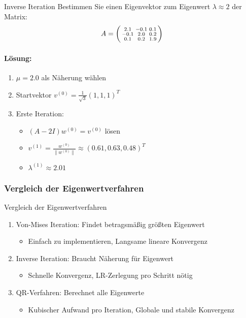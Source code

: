 \begin{example2}{Inverse Iteration}
Bestimmen Sie einen Eigenvektor zum Eigenwert $\lambda \approx 2$ der Matrix:
$$A = \begin{psmallmatrix}
2.1 & -0.1 & 0.1 \\
-0.1 & 2.0 & 0.2 \\
0.1 & 0.2 & 1.9
\end{psmallmatrix}$$

\paragraph{Lösung:}
\begin{enumerate}
    \item $\mu = 2.0$ als Näherung wählen
    \item Startvektor $v^{(0)} = \frac{1}{\sqrt{3}}(1,1,1)^T$
    \item Erste Iteration:
    \begin{itemize}
        \item $(A-2I)w^{(0)} = v^{(0)}$ lösen
        \item $v^{(1)} = \frac{w^{(0)}}{\|w^{(0)}\|} \approx (0.61, 0.63, 0.48)^T$
        \item $\lambda^{(1)} \approx 2.01$
    \end{itemize}
\end{enumerate}
\end{example2}


\subsubsection{Vergleich der Eigenwertverfahren}





\begin{concept}{Vergleich der Eigenwertverfahren}
\begin{enumerate}
    \item Von-Mises Iteration: Findet betragsmäßig größten Eigenwert
    \begin{itemize}
        \item Einfach zu implementieren, Langsame lineare Konvergenz
    \end{itemize}
    
    \item Inverse Iteration: Braucht Näherung für Eigenwert
    \begin{itemize}
        \item Schnelle Konvergenz, LR-Zerlegung pro Schritt nötig
    \end{itemize}
    
    \item QR-Verfahren: Berechnet alle Eigenwerte
    \begin{itemize}
        \item Kubischer Aufwand pro Iteration, Globale und stabile Konvergenz
    \end{itemize}
\end{enumerate}
\end{concept}

